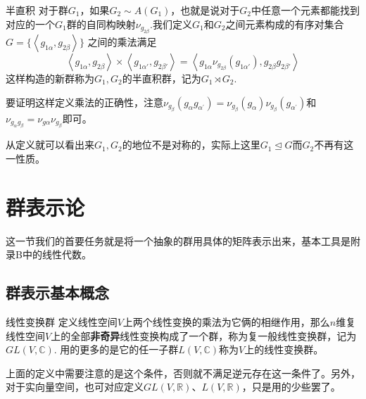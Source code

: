 \begin{define}{半直积}
    对于群$G_1$，如果$G_2\sim A(G_1)$，也就是说对于$G_2$中任意一个元素都能找到对应的一个$G_1$群的自同构映射$\nu_{g_{2\beta}}$.我们定义$G_1$和$G_2$之间元素构成的有序对集合$G=\{\left \langle g_{1\alpha},g_{2\beta}\right\rangle\}$
    之间的乘法满足
    \[\left\langle {{g_{1\alpha }},{g_{2\beta }}} \right\rangle  \times \left\langle {{g_{1\alpha '}},{g_{2\beta '}}} \right\rangle  = \left\langle {{g_{1\alpha }}{\nu _{{g_{2\beta }}}}({g_{1\alpha '}}),{g_{2\beta }}{g_{2\beta '}}} \right\rangle \]
    这样构造的新群称为$G_1,G_2$的半直积群，记为$G_1 \rtimes G_2$.
\end{define}
要证明这样定义乘法的正确性，注意$\nu_{g_{\beta}}(g_{\alpha}g_{\alpha^\prime})=\nu_{g_{\beta}}(g_{\alpha})\nu_{g_{\beta}}(g_{\alpha^\prime})$和$\nu_{g_\alpha g_\beta}=\nu_{g\alpha}\nu_{g_\beta}$即可。

从定义就可以看出来$G_1,G_2$的地位不是对称的，实际上这里$G_1\unlhd G$而$G_2$不再有这一性质。

\section{群表示论}
这一节我们的首要任务就是将一个抽象的群用具体的矩阵表示出来，基本工具是附录B中的线性代数。
\subsection{群表示基本概念}
\begin{define}{线性变换群}
    定义线性空间$V$上两个线性变换的乘法为它俩的相继作用，那么$n$维复线性空间$V$上的全部\textbf{非奇异}线性变换构成了一个群，称为复一般线性变换群，记为$GL(V,\mathbb{C})$.
    用的更多的是它的任一子群$L(V,\mathbb{C})$称为$V$上的线性变换群。
\end{define}
上面的定义中需要注意的是这个条件，否则就不满足逆元存在这一条件了。另外，对于实向量空间，也可对应定义$GL(V,\mathbb{R})$、$L(V,\mathbb{R})$，只是用的少些罢了。

